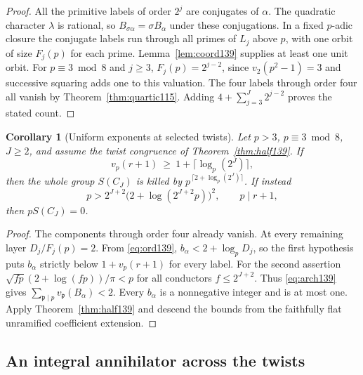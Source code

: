 \documentclass[a4paper,11pt]{article}
\newtheorem{corollary}[proposition]{Corollary}
\theoremstyle{definition}
\theoremstyle{remark}
\numberwithin{equation}{section}
\begin{document}
\begin{proof}
All the primitive labels of order \(2^j\) are conjugates of
\(\alpha\). The quadratic character \(\lambda\) is rational,
so \(B_{\sigma\alpha}=\sigma B_\alpha\) under these conjugations.
In a fixed \(p\)-adic closure the conjugate labels run through
all primes of \(L_j\) above \(p\), with one orbit of size
\(F_j(p)\) for each prime. Lemma~\ref{lem:coord139} supplies
at least one unit orbit. For \(p\equiv3\bmod8\) and \(j\ge3\),
\(F_j(p)=2^{j-2}\), since \(v_2(p^2-1)=3\) and successive
squaring adds one to this valuation. The four labels through
order four all vanish by Theorem~\ref{thm:quartic115}.
Adding \(4+\sum_{j=3}^J2^{j-2}\) proves the stated count.
\end{proof}

\begin{corollary}[Uniform exponents at selected twists]
\label{cor:exp139}
Let \(p>3\), \(p\equiv3\bmod8\), \(J\ge2\), and assume the twist
congruence of Theorem~\ref{thm:half139}. If
\[
              v_p(r+1)\ \ge\ 1+\lceil\log_p(2^J)\rceil ,
\]
then the whole group \(S(C_J)\) is killed by
\(p^{\,\lceil2+\log_p(2^J)\rceil}\). If instead
\[
       p> 2^{J+2}\bigl(2+\log(2^{J+2}p)\bigr)^2,\qquad
       p\mid r+1 ,
\]
then \(p S(C_J)=0\).
\end{corollary}
\begin{proof}
The components through order four already vanish. At every
remaining layer \(D_j/F_j(p)=2\). From \eqref{eq:ord139},
\(b_\alpha<2+\log_p D_j\), so the first hypothesis puts
\(b_\alpha\) strictly below \(1+v_p(r+1)\) for every label.
For the second assertion \(\sqrt{fp}(2+\log(fp))/\pi<p\) for
all conductors \(f\le2^{J+2}\). Thus \eqref{eq:arch139}
gives \(\sum_{\mathfrak p\mid p}v_{\mathfrak p}(B_\alpha)<2\).
Every \(b_\alpha\) is a nonnegative integer and is at most one.
Apply Theorem~\ref{thm:half139} and descend the bounds from the
faithfully flat unramified coefficient extension.
\end{proof}

\subsection{An integral annihilator across the twists}\label{nav:III-20}
\label{sec:inter141}
\end{document}
